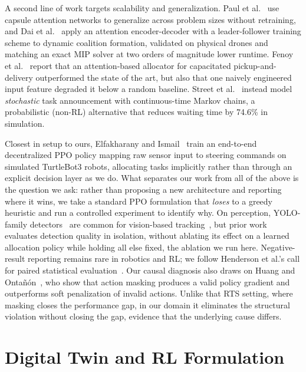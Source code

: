 \documentclass[conference]{IEEEtran}
\begin{document}
A second line of work targets scalability and generalization. Paul et al.~\cite{paul2022capsule} use capsule attention networks to generalize across problem sizes without retraining, and Dai et al.~\cite{dai2024dynamic} apply an attention encoder-decoder with a leader-follower training scheme to dynamic coalition formation, validated on physical drones and matching an exact MIP solver at two orders of magnitude lower runtime. Fenoy et al.~\cite{fenoy2024attention} report that an attention-based allocator for capacitated pickup-and-delivery outperformed the state of the art, but also that one naively engineered input feature degraded it below a random baseline. Street et al.~\cite{street2024right} instead model \emph{stochastic} task announcement with continuous-time Markov chains, a probabilistic (non-RL) alternative that reduces waiting time by 74.6\% in simulation.

Closest in setup to ours, Elfakharany and Ismail~\cite{elfakharany2021endtoend} train an end-to-end decentralized PPO policy mapping raw sensor input to steering commands on simulated TurtleBot3 robots, allocating tasks implicitly rather than through an explicit decision layer as we do. What separates our work from all of the above is the question we ask: rather than proposing a new architecture and reporting where it wins, we take a standard PPO formulation that \emph{loses} to a greedy heuristic and run a controlled experiment to identify why. On perception, YOLO-family detectors~\cite{yolov8} are common for vision-based tracking~\cite{ahmed2021topview}, but prior work evaluates detection quality in isolation, without ablating its effect on a learned allocation policy while holding all else fixed, the ablation we run here. Negative-result reporting remains rare in robotics and RL; we follow Henderson et al.'s call for paired statistical evaluation~\cite{henderson2018deep}. Our causal diagnosis also draws on Huang and Ontañón~\cite{huang2022masking}, who show that action masking produces a valid policy gradient and outperforms soft penalization of invalid actions. Unlike that RTS setting, where masking closes the performance gap, in our domain it eliminates the structural violation without closing the gap, evidence that the underlying cause differs.

\section{Digital Twin and RL Formulation}
\end{document}
